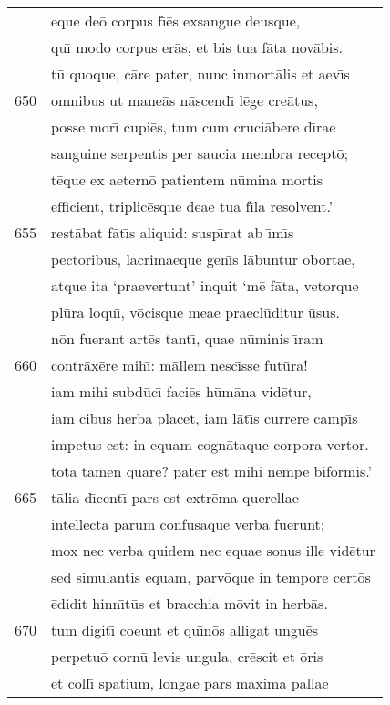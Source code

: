 \documentclass[paper=6in:9in,pagesize=pdftex,
               headinclude=on,footinclude=on,12pt]{scrbook}
\begin{document}
\begin{longtable}[p]{ r l }
 & eque de\=o corpus f\={\i}\=es exsangue deusque,\\ 
 & qu\={\i} modo corpus er\=as, et bis tua f\=ata nov\=abis.\\ 
 & t\=u quoque, c\=are pater, nunc inmort\=alis et aev\={\i}s\\ 
650 & omnibus ut mane\=as n\=ascend\={\i} l\=ege cre\=atus,\\ 
 & posse mor\={\i} cupi\=es, tum cum cruci\=abere d\={\i}rae\\ 
 & sanguine serpentis per saucia membra recept\=o;\\ 
 & t\=eque ex aetern\=o patientem n\=umina mortis\\ 
 & efficient, triplic\=esque deae tua f\={\i}la resolvent.'\\ 
655 & rest\=abat f\=at\={\i}s aliquid: susp\={\i}rat ab \={\i}m\={\i}s\\ 
 & pectoribus, lacrimaeque gen\={\i}s l\=abuntur obortae,\\ 
 & atque ita `praevertunt' inquit `m\=e f\=ata, vetorque\\ 
 & pl\=ura loqu\={\i}, v\=ocisque meae praecl\=uditur \=usus.\\ 
 & n\=on fuerant art\=es tant\={\i}, quae n\=uminis \={\i}ram\\ 
660 & contr\=ax\=ere mih\={\i}: m\=allem nesc\={\i}sse fut\=ura!\\ 
 & iam mihi subd\=uc\={\i} faci\=es h\=um\=ana vid\=etur,\\ 
 & iam cibus herba placet, iam l\=at\={\i}s currere camp\={\i}s\\ 
 & impetus est: in equam cogn\=ataque corpora vertor.\\ 
 & t\=ota tamen qu\=ar\=e? pater est mihi nempe bif\=ormis.'\\ 
665 & t\=alia d\={\i}cent\={\i} pars est extr\=ema querellae\\ 
 & intell\=ecta parum c\=onf\=usaque verba fu\=erunt;\\ 
 & mox nec verba quidem nec equae sonus ille vid\=etur\\ 
 & sed simulantis equam, parv\=oque in tempore cert\=os\\ 
 & \=edidit hinn\={\i}t\=us et bracchia m\=ovit in herb\=as.\\ 
670 & tum digit\={\i} coeunt et qu\={\i}n\=os alligat ungu\=es\\ 
 & perpetu\=o corn\=u levis ungula, cr\=escit et \=oris\\ 
 & et coll\={\i} spatium, longae pars maxima pallae\\ 

\end{longtable}
\end{document}
